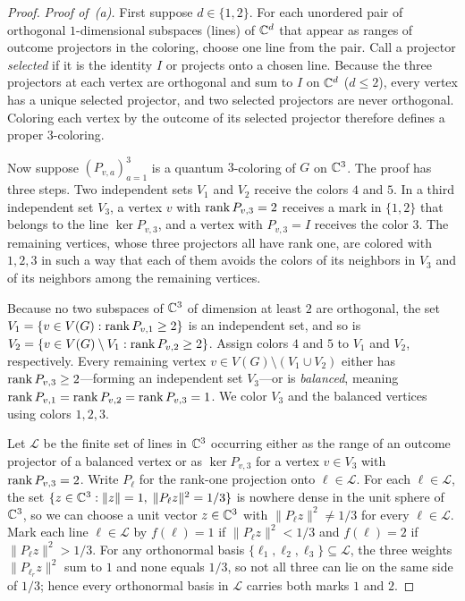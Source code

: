\begin{proof}
\emph{Proof of~(a).} First suppose $d\in\{1,2\}$. For each unordered pair of orthogonal $1$-dimensional subspaces (lines) of $\mathbb C^d$ that appear as ranges of outcome projectors in the coloring, choose one line from the pair. Call a projector \emph{selected} if it is the identity $I$ or projects onto a chosen line. Because the three projectors at each vertex are orthogonal and sum to $I$ on $\mathbb C^d$ ($d\le2$), every vertex has a unique selected projector, and two selected projectors are never orthogonal. Coloring each vertex by the outcome of its selected projector therefore defines a proper $3$-coloring.

Now suppose $(P_{v,a})_{a=1}^3$ is a quantum $3$-coloring of $G$ on $\mathbb C^3$. The proof has three steps. Two independent sets $V_1$ and $V_2$ receive the colors $4$ and $5$. In a third independent set $V_3$, a vertex $v$ with $\operatorname{rank} P_{v,3}=2$ receives a mark in $\{1,2\}$ that belongs to the line $\ker P_{v,3}$, and a vertex with $P_{v,3}=I$ receives the color $3$. The remaining vertices, whose three projectors all have rank one, are colored with $1,2,3$ in such a way that each of them avoids the colors of its neighbors in $V_3$ and of its neighbors among the remaining vertices.

Because no two subspaces of $\mathbb C^3$ of dimension at least $2$ are orthogonal, the set $V_1=\{v\in V(G):\operatorname{rank} P_{v,1}\ge2\}$ is an independent set, and so is $V_2=\{v\in V(G)\setminus V_1:\operatorname{rank} P_{v,2}\ge2\}$. Assign colors $4$ and $5$ to $V_1$ and $V_2$, respectively. Every remaining vertex $v\in V(G)\setminus(V_1\cup V_2)$ either has $\operatorname{rank} P_{v,3}\ge2$---forming an independent set $V_3$---or is \emph{balanced}, meaning $\operatorname{rank} P_{v,1}=\operatorname{rank} P_{v,2}=\operatorname{rank} P_{v,3}=1$. We color $V_3$ and the balanced vertices using colors $1,2,3$.

Let $\mathcal L$ be the finite set of lines in $\mathbb C^3$ occurring either as the range of an outcome projector of a balanced vertex or as $\ker P_{v,3}$ for a vertex $v\in V_3$ with $\operatorname{rank} P_{v,3}=2$. Write $P_\ell$ for the rank-one projection onto $\ell\in\mathcal L$. For each $\ell\in\mathcal L$, the set $\{z\in\mathbb C^3:\|z\|=1,\;\|P_\ell z\|^2=1/3\}$ is nowhere dense in the unit sphere of $\mathbb C^3$, so we can choose a unit vector $z\in\mathbb C^3$ with $\|P_\ell z\|^2\ne1/3$ for every $\ell\in\mathcal L$. Mark each line $\ell\in\mathcal L$ by $f(\ell)=1$ if $\|P_\ell z\|^2<1/3$ and $f(\ell)=2$ if $\|P_\ell z\|^2>1/3$. For any orthonormal basis $\{\ell_1,\ell_2,\ell_3\}\subseteq\mathcal L$, the three weights $\|P_{\ell_r}z\|^2$ sum to $1$ and none equals $1/3$, so not all three can lie on the same side of $1/3$; hence every orthonormal basis in $\mathcal L$ carries both marks $1$ and $2$.


\end{proof}
